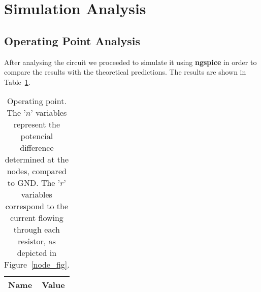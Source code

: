 \section{Simulation Analysis}
\label{sec:simulation}

\subsection{Operating Point Analysis}

After analysing the circuit we proceeded to simulate it using {\bf ngspice} in order to compare the results with the theoretical predictions. The results are shown in Table~\ref{tab:op}.


\begin{table}[h]
	\centering
	\begin{tabular}{|l|c|}
		\hline    
		    {\bf Name} & {\bf Value} \\
                    \hline
                    \hline
		
	\end{tabular}
	\caption{Operating point. The '$n$' variables represent the potencial difference determined at the nodes, compared to GND. The '$r$' variables correspond to the current flowing through each resistor, as depicted in Figure~\ref{node_fig}.}
	\label{tab:op}
\end{table}
